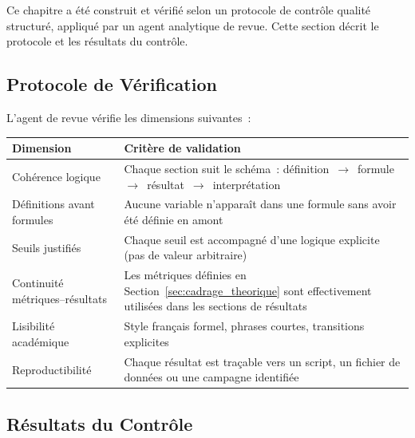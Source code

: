 Ce chapitre a été construit et vérifié selon un protocole de contrôle qualité structuré, appliqué par un agent analytique de revue. Cette section décrit le protocole et les résultats du contrôle.

\subsection{Protocole de Vérification}

L'agent de revue vérifie les dimensions suivantes~:

\begin{longtable}{p{4cm}p{9cm}}
\toprule
\textbf{Dimension} & \textbf{Critère de validation} \\
\midrule
Cohérence logique & Chaque section suit le schéma~: définition~$\to$~formule~$\to$~résultat~$\to$~interprétation \\
Définitions avant formules & Aucune variable n'apparaît dans une formule sans avoir été définie en amont \\
Seuils justifiés & Chaque seuil est accompagné d'une logique explicite (pas de valeur arbitraire) \\
Continuité métriques--résultats & Les métriques définies en Section~\ref{sec:cadrage_theorique} sont effectivement utilisées dans les sections de résultats \\
Lisibilité académique & Style français formel, phrases courtes, transitions explicites \\
Reproductibilité & Chaque résultat est traçable vers un script, un fichier de données ou une campagne identifiée \\
\bottomrule
\end{longtable}

\subsection{Résultats du Contrôle}

